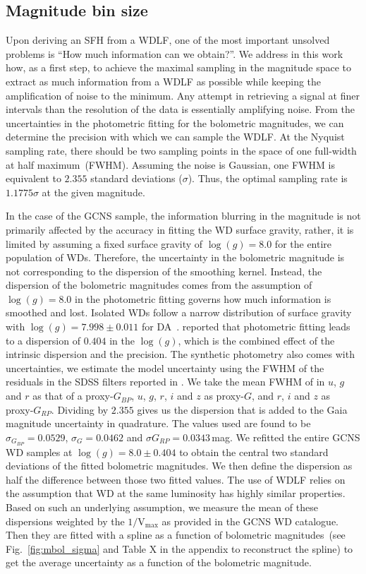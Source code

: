 \documentclass[fleqn,usenatbib]{mnras}
\begin{document}
\subsection{Magnitude bin size}
\label{sec:magnitude_bin_size}
Upon deriving an SFH from a WDLF, one of the most important unsolved problems
is ``How much information can we obtain?''. We address in this work 
how, as a first step, to achieve the maximal sampling in the magnitude
space to extract as much information from a WDLF as possible while keeping
the amplification of noise to the minimum. Any attempt in retrieving a signal
at finer intervals than the resolution of the data is essentially amplifying
noise. From the uncertainties in the photometric fitting for the bolometric
magnitudes, we can determine the precision with which we can sample the WDLF.
At the Nyquist sampling rate, there should be two sampling points in the
space of one full-width at half maximum~(FWHM). Assuming the noise is Gaussian,
one FWHM is equivalent to $2.355$ standard deviations ($\sigma$). Thus, the
optimal sampling rate is $1.1775\sigma$ at the given magnitude.

In the case of the GCNS sample, the information blurring in the magnitude is
not primarily affected by the accuracy in fitting the WD surface gravity,
rather, it is limited by assuming a fixed surface gravity of $\log(g) = 8.0$
for the entire population of WDs. Therefore, the uncertainty in the
bolometric magnitude is not corresponding to the dispersion of the smoothing
kernel. Instead, the dispersion of the bolometric magnitudes comes from the
assumption of $\log(g) = 8.0$ in the photometric fitting governs how much
information is smoothed and lost. Isolated WDs follow a narrow distribution
of surface gravity with $\log(g)=7.998 \pm 0.011$ for
DA~\citep{2021MNRAS.507.4646K}. \citet{2014ApJ...796..128G} reported that
photometric fitting leads to a dispersion of $0.404$ in the $\log(g)$, which
is the combined effect of the intrinsic dispersion and the precision. 
The synthetic photometry also comes with uncertainties, we estimate the
model uncertainty using the FWHM of the residuals in the SDSS filters
reported in \citet{2006AJ....132.1221H}. We take the mean FWHM of in
$u$, $g$ and $r$ as that of a proxy-$G_{BP}$, $u$, $g$, $r$, $i$ and $z$ as 
proxy-$G$, and $r$, $i$ and $z$ as proxy-$G_{RP}$. Dividing by $2.355$
gives us the dispersion that is added to the Gaia magnitude uncertainty
in quadrature. The values used are found to be $\sigma_{G_{BP}}=0.0529$,
$\sigma_{G}=0.0462$ and $\sigma{G_{RP}}=0.0343$\,mag. We refitted the entire 
GCNS WD samples at $\log(g) = 8.0 \pm 0.404$ to obtain the central two
standard deviations of the fitted bolometric magnitudes. We then define the
dispersion as half the difference between those two fitted values. The use
of WDLF relies on the assumption that WD at the same luminosity has highly
similar properties. Based on such an underlying assumption, we measure the
mean of these dispersions weighted by the $1/\mathrm{V}_{\mathrm{max}}$ as
provided in the GCNS WD catalogue. Then they are fitted with a spline as a
function of bolometric magnitudes~(see Fig.~\ref{fig:mbol_sigma} and
Table X in the appendix to reconstruct the spline) to get the average 
uncertainty as a function of the bolometric magnitude.
\end{document}
